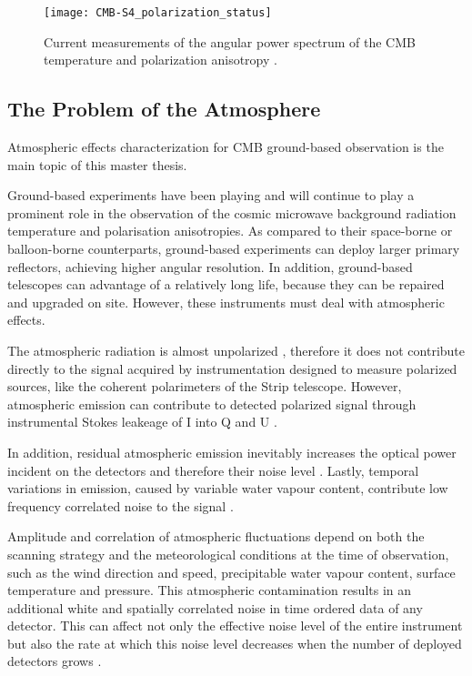 \begin{figure}
        \centering
        \texttt{[image: CMB-S4\_polarization\_status]}
        \caption{Current measurements of the angular power spectrum of the
        CMB temperature and polarization anisotropy
        \autocite{abazajian2016cmb}.}
        \label{fig:cmb-s4_polarization_status}
\end{figure}

\subsection{The Problem of the Atmosphere}\label{ss:atmosphere_problem}

Atmospheric effects characterization for CMB ground-based observation is
the main topic of this master thesis.

Ground-based experiments have been playing and will continue to play a
prominent role in the observation of the cosmic microwave background
radiation temperature and polarisation anisotropies. As compared to their
space-borne or balloon-borne counterparts, ground-based experiments can
deploy larger primary reflectors, achieving higher angular resolution.  In
addition, ground-based telescopes can advantage of a relatively long life,
because they can be repaired and upgraded on site.  However, these
instruments must deal with atmospheric effects.

The atmospheric radiation is almost unpolarized
\autocite{hanany2003polarization}, therefore it does not contribute
directly to the signal acquired by instrumentation designed to measure
polarized sources, like the coherent polarimeters of the Strip telescope.
However, atmospheric emission can contribute to detected polarized signal
through instrumental Stokes leakeage of I into Q and U
\autocite{arnold2010design}.

In addition, residual atmospheric emission inevitably increases the optical
power incident on the detectors and therefore their noise level
\autocite{bersanelli1995effects}.  Lastly, temporal variations in emission,
caused by variable water vapour content, contribute low frequency
correlated noise to the signal \autocite{church1995predicting}.

Amplitude and correlation of atmospheric fluctuations depend on both the
scanning strategy and the meteorological conditions at the time of
observation, such as the wind direction and speed, precipitable water
vapour content, surface temperature and pressure.  This atmospheric
contamination results in an additional white and spatially correlated noise
in time ordered data of any detector. This can affect not only the
effective noise level of the entire instrument but also the rate at which
this noise level decreases when the number of deployed detectors grows
\autocite{errard2015modeling}.
